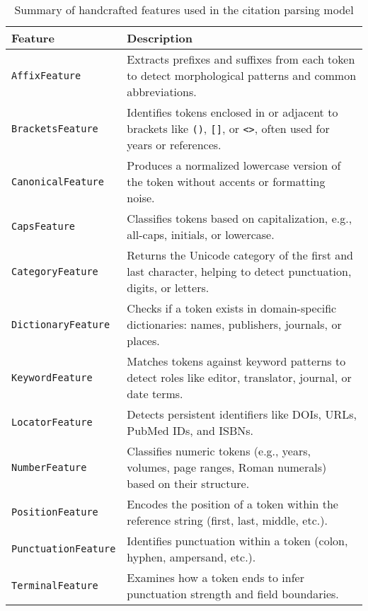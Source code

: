 \begin{table}[ht]
\centering
\caption[Summary of Handcrafted Features]{Summary of handcrafted features used in the citation parsing model}
\label{tab:handcrafted-features}
\begin{tabular}{p{4cm}p{10cm}}
\toprule
\textbf{Feature} & \textbf{Description} \\
\midrule
\texttt{AffixFeature} & Extracts prefixes and suffixes from each token to detect morphological patterns and common abbreviations. \\
\texttt{BracketsFeature} & Identifies tokens enclosed in or adjacent to brackets like \texttt{()}, \texttt{[]}, or \texttt{<>}, often used for years or references. \\
\texttt{CanonicalFeature} & Produces a normalized lowercase version of the token without accents or formatting noise. \\
\texttt{CapsFeature} & Classifies tokens based on capitalization, e.g., all-caps, initials, or lowercase. \\
\texttt{CategoryFeature} & Returns the Unicode category of the first and last character, helping to detect punctuation, digits, or letters. \\
\texttt{DictionaryFeature} & Checks if a token exists in domain-specific dictionaries: names, publishers, journals, or places. \\
\texttt{KeywordFeature} & Matches tokens against keyword patterns to detect roles like editor, translator, journal, or date terms. \\
\texttt{LocatorFeature} & Detects persistent identifiers like DOIs, URLs, PubMed IDs, and ISBNs. \\
\texttt{NumberFeature} & Classifies numeric tokens (e.g., years, volumes, page ranges, Roman numerals) based on their structure. \\
\texttt{PositionFeature} & Encodes the position of a token within the reference string (first, last, middle, etc.). \\
\texttt{PunctuationFeature} & Identifies punctuation within a token (colon, hyphen, ampersand, etc.). \\
\texttt{TerminalFeature} & Examines how a token ends to infer punctuation strength and field boundaries. \\
\bottomrule
\end{tabular}
\end{table}
\renewcommand{\arraystretch}{1.0}



